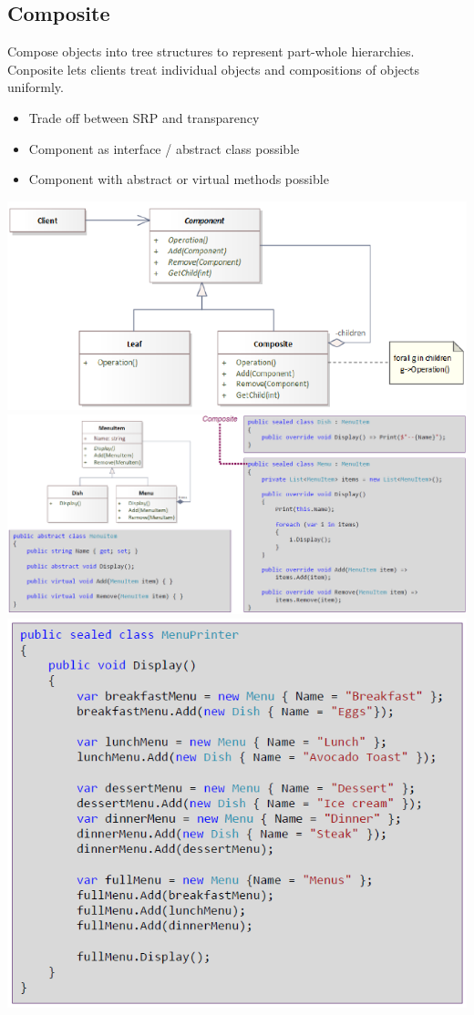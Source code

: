 \subsection{Composite}
Compose objects into tree structures to represent part-whole hierarchies.\\
Conposite lets clients treat individual objects and compositions of objects uniformly.\\
\begin{itemize}
    \item Trade off between SRP and transparency
    \item Component as interface / abstract class possible
    \item Component with abstract or virtual methods possible
\end{itemize}
\includegraphics[width=0.7\linewidth]{../img/composite_pattern.png}\\
\includegraphics[width=\linewidth]{../img/composite_pattern_code.png}\\
\includegraphics[width=0.7\linewidth]{../img/composite_pattern_code_2.png}\\

